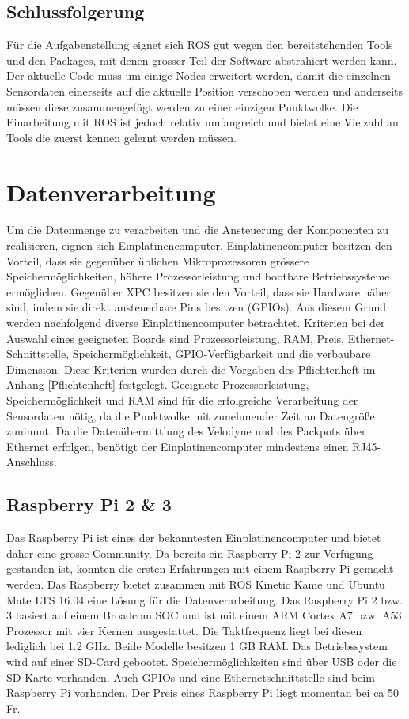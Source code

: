 \subsection{Schlussfolgerung}
Für die Aufgabenstellung eignet sich ROS gut wegen den bereitstehenden Tools und den Packages, mit denen grosser Teil der Software abstrahiert werden kann. Der aktuelle Code muss um einige Nodes erweitert werden, damit die einzelnen Sensordaten einerseits auf die aktuelle Position verschoben werden und anderseits müssen diese zusammengefügt werden zu einer einzigen Punktwolke. Die Einarbeitung mit ROS ist jedoch relativ umfangreich und bietet eine Vielzahl an Tools die zuerst kennen gelernt werden müssen.  

\section{Datenverarbeitung}
\label{sec:Datenverarbeitung}
Um die Datenmenge zu verarbeiten und die Ansteuerung der Komponenten zu realisieren, eignen sich Einplatinencomputer. Einplatinencomputer besitzen den Vorteil, dass sie gegenüber üblichen Mikroprozessoren grössere Speichermöglichkeiten, höhere Prozessorleistung und bootbare Betriebssysteme ermöglichen. Gegenüber \ac{XPC} besitzen sie den Vorteil, dass sie Hardware näher sind, indem sie direkt ansteuerbare Pins besitzen (GPIOs). Aus diesem Grund werden nachfolgend diverse Einplatinencomputer betrachtet. Kriterien bei der Auswahl eines geeigneten Boards sind Prozessorleistung, \ac{RAM}, Preis, Ethernet-Schnittstelle, Speichermöglichkeit, GPIO-Verfügbarkeit und die verbaubare Dimension. Diese Kriterien wurden durch die Vorgaben des Pflichtenheft im Anhang \ref{Pflichtenheft} festgelegt. Geeignete Prozessorleistung, Speichermöglichkeit und \ac{RAM} sind für die erfolgreiche Verarbeitung der Sensordaten nötig, da die Punktwolke mit zunehmender Zeit an Datengröße zunimmt. Da die Datenübermittlung des Velodyne und des Packpots über Ethernet erfolgen, benötigt der Einplatinencomputer mindestens einen RJ45-Anschluss.

\subsection{Raspberry Pi 2 \& 3}
\label{subsec:Raspberry}
Das Raspberry Pi ist eines der bekanntesten Einplatinencomputer und bietet daher eine grosse Community. Da bereits ein Raspberry Pi 2 zur Verfügung gestanden ist, konnten die ersten Erfahrungen mit einem Raspberry Pi gemacht werden. Das Raspberry bietet zusammen mit ROS Kinetic Kame und Ubuntu Mate LTS 16.04 eine Lösung für die Datenverarbeitung. Das Raspberry Pi 2 bzw. 3 basiert auf einem Broadcom \ac{SOC} und ist mit einem \ac{ARM} Cortex A7 bzw. A53 Prozessor mit vier Kernen ausgestattet. Die Taktfrequenz liegt bei diesen lediglich bei 1.2 GHz. Beide Modelle besitzen 1 GB \ac{RAM}. Das Betriebssystem wird auf einer \ac{SD}-Card gebootet. Speichermöglichkeiten sind über USB oder die SD-Karte vorhanden. Auch GPIOs und eine Ethernetschnittstelle sind beim Raspberry Pi vorhanden. Der Preis eines Raspberry Pi liegt momentan bei ca 50 Fr. \cite{rpi}

